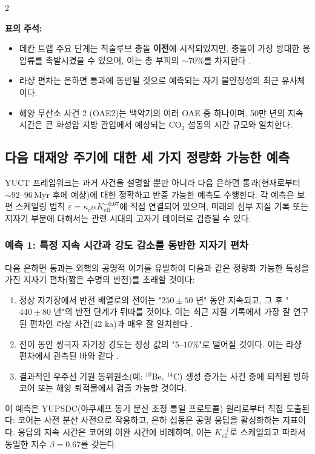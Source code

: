 \documentclass[12pt,a4paper]{article}
\begin{document}
	\begin{multicols}{2}
		
		\noindent
		\textbf{표의 주석:}
		\begin{itemize}
			\item 데칸 트랩 주요 단계는 칙술루브 충돌 \textbf{이전}에 시작되었지만, 충돌이 가장 방대한 용암류를 촉발시켰을 수 있으며, 이는 총 부피의 \(\sim 70\%\)를 차지한다 \cite{DeccanTriggering}.
			\item 라샹 편차는 은하면 통과에 동반될 것으로 예측되는 자기 불안정성의 최근 유사체이다.
			\item 해양 무산소 사건 2 (OAE2)는 백악기의 여러 OAE 중 하나이며, 50만 년의 지속 시간은 큰 화성암 지방 관입에서 예상되는 CO\(_2\) 섭동의 시간 규모와 일치한다.
		\end{itemize}
		
		\subsection{다음 대재앙 주기에 대한 세 가지 정량화 가능한 예측}
		YUCT 프레임워크는 과거 사건을 설명할 뿐만 아니라 다음 은하면 통과(현재로부터 \(\sim 92\)–\(96\) Myr 후에 예상)에 대한 정확하고 반증 가능한 예측도 수행한다. 각 예측은 보편 스케일링 법칙 \(\varepsilon = \kappa_c \alpha K_{\mathrm{eff}}^{-0.67}\)에 직접 연결되어 있으며, 미래의 심부 지질 기록 또는 지자기 부분에 대해서는 관련 시대의 고자기 데이터로 검증될 수 있다.
		
		\subsubsection{예측 1: 특정 지속 시간과 강도 감소를 동반한 지자기 편차}
		다음 은하면 통과는 외핵의 공명적 여기를 유발하여 다음과 같은 정량화 가능한 특성을 가진 지자기 편차(짧은 수명의 반전)를 초래할 것이다:
		\begin{enumerate}
			\item 정상 자기장에서 반전 배열로의 전이는 "\(250 \pm 50\) 년" 동안 지속되고, 그 후 "\(440 \pm 80\) 년"의 반전 단계가 뒤따를 것이다. 이는 최근 지질 기록에서 가장 잘 연구된 편차인 라샹 사건(42 ka)과 매우 잘 일치한다 \cite{Laschamp}.
			\item 전이 동안 쌍극자 자기장 강도는 정상 값의 "\(5\)–\(10\%\)"로 떨어질 것이다. 이는 라샹 편차에서 관측된 바와 같다 \cite{Laschamp}.
			\item 결과적인 우주선 기원 동위원소(예: \(^{10}\)Be, \(^{14}\)C) 생성 증가는 사건 중에 퇴적된 빙하 코어 또는 해양 퇴적물에서 검출 가능할 것이다.
		\end{enumerate}
		이 예측은 YUPSDC(야쿠셰프 동기 분산 조정 통일 프로토콜) 원리로부터 직접 도출된다: 코어는 사전 분산 사전으로 작용하고, 은하 섭동은 공명 응답을 활성화하는 지표이다. 응답의 지속 시간은 코어의 이완 시간에 비례하며, 이는 \(K_{\mathrm{eff}}^{-1}\)로 스케일되고 따라서 동일한 지수 \(\beta=0.67\)를 갖는다.
		

\end{multicols}
\end{document}
